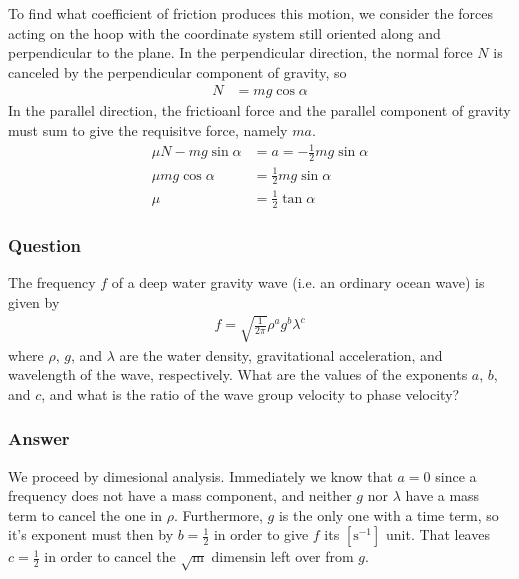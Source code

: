 To find what coefficient of friction produces this motion, we consider the
forces acting on the hoop with the coordinate system still oriented along and
perpendicular to the plane. In the perpendicular direction, the normal force
$N$ is canceled by the perpendicular component of gravity, so
\begin{align*}
    N &= mg\cos α
\end{align*}
In the parallel direction, the frictioanl force and the parallel component of
gravity must sum to give the requisitve force, namely $ma$.
\begin{align*}
    μN - mg\sin α &= a = -\frac 12 mg\sin α \\
    μmg\cos α &= \frac 12 mg\sin α \\
    μ &= \frac 12 \tan α
\end{align*}


\subsubsection{Question}

The frequency $f$ of a deep water gravity wave (i.e. an ordinary ocean wave)
is given by
\begin{align*}
    f =\sqrt{\frac{1}{2π}} ρ^a g^b λ^c
\end{align*}
where $ρ$, $g$, and $λ$ are the water density, gravitational acceleration, and
wavelength of the wave, respectively. What are the values of the exponents
$a$, $b$, and $c$, and what is the ratio of the wave group velocity to phase
velocity?

\subsubsection{Answer}

We proceed by dimesional analysis. Immediately we know that $a = 0$ since a
frequency does not have a mass component, and neither $g$ nor $λ$ have a
mass term to cancel the one in $ρ$. Furthermore, $g$ is the only one with a
time term, so it's exponent must then by $b = \frac 12$ in order to give $f$
its $[\si{\s^{-1}}]$ unit. That leaves $c = \frac 12$ in order to cancel
the $\sqrt{\si{\m}}$ dimensin left over from $g$.

